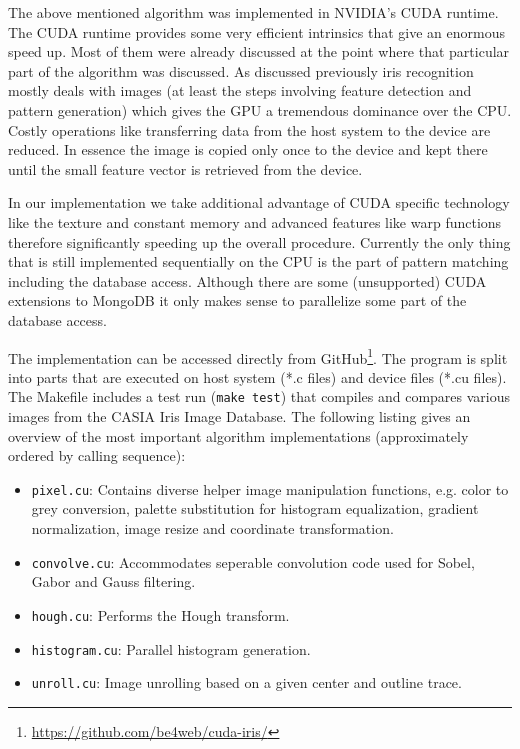 \documentclass[journal]{IEEEtran}
\begin{document}
The above mentioned algorithm was implemented in NVIDIA's CUDA runtime. The CUDA runtime provides some very efficient intrinsics that give an enormous speed up. Most of them were already discussed at the point where that particular part of the algorithm was discussed. As discussed previously iris recognition mostly deals with images (at least the steps involving feature detection and pattern generation) which gives the GPU a tremendous dominance over the CPU. Costly operations like transferring data from the host system to the device are reduced. In essence the image is copied only once to the device and kept there until the small feature vector is retrieved from the device.
\par In our implementation we take additional advantage of CUDA specific technology like the texture and constant memory and advanced features like warp functions therefore significantly speeding up the overall procedure. Currently the only thing that is still implemented sequentially on the CPU is the part of pattern matching including the database access. Although there are some (unsupported) CUDA extensions to MongoDB it only makes sense to parallelize some part of the database access.
\par The implementation can be accessed directly from GitHub\footnote{\url{https://github.com/be4web/cuda-iris/}}. The program is split into parts that are executed on host system (*.c files) and device files (*.cu files). The Makefile includes a test run (\verb+make test+) that compiles and compares various images from the CASIA Iris Image Database. The following listing gives an overview of the most important algorithm implementations (approximately ordered by calling sequence):
\begin{itemize}
	\item \verb+pixel.cu+: Contains diverse helper image manipulation functions, e.g. color to grey conversion, palette substitution for histogram equalization, gradient normalization, image resize and coordinate transformation.
	\item \verb+convolve.cu+: Accommodates seperable convolution code used for Sobel, Gabor and Gauss filtering.
	\item \verb+hough.cu+: Performs the Hough transform.
	\item \verb+histogram.cu+: Parallel histogram generation. 
	\item \verb+unroll.cu+: Image unrolling based on a given center and outline trace.
\end{itemize}
\end{document}
